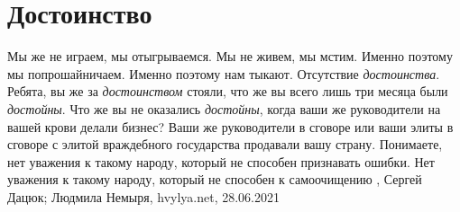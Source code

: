  
 
 
 
 
\chapter{Достоинство}
\label{sec:slova.dostoinstvo}

Мы же не играем, мы отыгрываемся. Мы не живем, мы мстим. Именно поэтому мы
попрошайничаем. Именно поэтому нам тыкают. Отсутствие \emph{достоинства}. Ребята, вы
же за \emph{достоинством} стояли, что же вы всего лишь три месяца были \emph{достойны}. Что
же вы не оказались \emph{достойны}, когда ваши же руководители на вашей крови делали
бизнес? Ваши же руководители в сговоре или ваши элиты в сговоре с элитой
враждебного государства продавали вашу страну. Понимаете, нет уважения к такому
народу, который не способен признавать ошибки. Нет уважения к такому народу,
который не способен к самоочищению
, 
Сергей Дацюк; Людмила Немыря, hvylya.net, 28.06.2021

